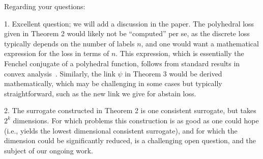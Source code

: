\documentclass{article}
\begin{document}
Regarding your questions:

1. Excellent question; we will add a discussion in the paper.
The polyhedral loss given in Theorem 2 would likely not be ``computed'' per se, as the discrete loss typically depends on the number of labels $n$, and one would want a mathematical expression for the loss in terms of $n$.
This expression, which is essentially the Fenchel conjugate of a polyhedral function, follows from standard results in convex analysis~\cite[Thm 19.1, Thm 19.2]{rockafellar1997convex}.
Similarly, the link $\psi$ in Theorem 3 would be derived mathematically, which may be challenging in some cases but typically straightforward, such as the new link we give for abstain loss.

2.
The surrogate constructed in Theorem 2 is one consistent surrogate, but takes $2^k$ dimensions.
For which problems this construction is as good as one could hope (i.e., yields the lowest dimensional consistent surrogate), and for which the dimension could be significantly reduced, is a challenging open question, and the subject of our ongoing work.



\end{document}
